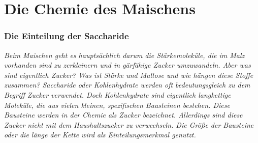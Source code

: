 \documentclass{scrartcl}  %
\begin{document}
\newpage
			
	\part{Die Chemie des Maischens}
	
	\section{Die Einteilung der Saccharide}
	
		\textit{Beim Maischen geht es hauptsächlich darum die Stärkemoleküle, die im Malz vorhanden sind zu zerkleinern und in gärfähige Zucker umzuwandeln. Aber was sind eigentlich Zucker? Was ist Stärke und Maltose und wie hängen diese Stoffe zusammen?
		Saccharide oder Kohlenhydrate werden oft bedeutungsgleich zu dem Begriff Zucker verwendet. Doch Kohlenhydrate sind eigentlich langkettige Moleküle, die aus vielen kleinen, spezifischen Bausteinen bestehen. Diese Bausteine werden in der Chemie als Zucker bezeichnet. Allerdings sind diese Zucker nicht mit dem Haushaltszucker zu verwechseln. Die Größe der Bausteine oder die länge der Kette wird als Einteilungsmerkmal genutzt.} \newline
		
\end{document}

